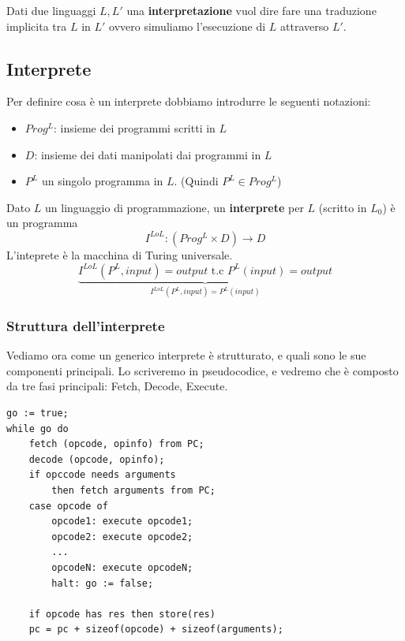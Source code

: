 \documentclass[a4paper]{article}
\begin{document}
{
    Dati due linguaggi $L, L'$ una \textbf{interpretazione} vuol dire fare una traduzione implicita 
    tra $L$ in $L'$ ovvero simuliamo l'esecuzione di $L$ attraverso $L'$.
}

\subsection{Interprete}

Per definire cosa è un interprete dobbiamo introdurre le seguenti notazioni:
\begin{itemize}
    \item $Prog^L$: insieme dei programmi scritti in $L$
    \item $D$: insieme dei dati manipolati dai programmi in $L$
    \item $P^L$ un singolo programma in $L$. (Quindi $P^L \in Prog^L$)
\end{itemize}

\dfn{}
{
    Dato $L$ un linguaggio di programmazione, un \textbf{interprete} per $L$ (scritto in $L_0$)
    è un programma \[I^{LoL} : (Prog^L \times D) \to D\]
    L'inteprete è la macchina di Turing universale.
    \[
    \underbrace{I^{LoL}(P^L, input) = output \text{ t.c } P^L(input) = output}_{
        I^{LoL}(P^L, input) = P^L(input)
    }
    \]
}


\subsubsection{Struttura dell'interprete}

Vediamo ora come un generico interprete è strutturato, e quali sono le sue componenti principali.
Lo scriveremo in pseudocodice, e vedremo che è composto da tre fasi principali: Fetch, Decode, Execute.
\begin{verbatim}
go := true;
while go do 
    fetch (opcode, opinfo) from PC;
    decode (opcode, opinfo);
    if opccode needs arguments
        then fetch arguments from PC;
    case opcode of
        opcode1: execute opcode1;
        opcode2: execute opcode2;
        ...
        opcodeN: execute opcodeN;
        halt: go := false;

    if opcode has res then store(res)
    pc = pc + sizeof(opcode) + sizeof(arguments);
\end{verbatim}
\end{document}
